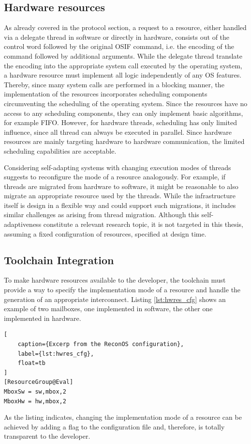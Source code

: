 \subsection{Hardware resources}
As already covered in the protocol section, a request to a resource, either
handled via a delegate thread in software or directly in hardware, consists
out of the control word followed by the original \ac{OSIF} command, i.e. the
encoding of the command followed by additional arguments. While the delegate
thread translate the encoding into the appropriate system call executed by the
operating system, a hardware resource must implement all logic independently
of any \ac{OS} features. Thereby, since many system calls are performed in a
blocking manner, the implementation of the resources incorporates scheduling
components circumventing the scheduling of the operating system. Since the
resources have no access to any scheduling components, they can only implement
basic algorithms, for example \acl{FIFO}. However, for hardware threads,
scheduling has only limited influence, since all thread can always be executed
in parallel. Since hardware resources are mainly targeting hardware to
hardware communication, the limited scheduling capabilities are acceptable.

Considering self-adapting systems with changing execution modes of threads
suggests to reconfigure the mode of a resource analogously. For example, if
threads are migrated from hardware to software, it might be reasonable to also
migrate an appropriate resource used by the threads. While the infrastructure
itself is design in a flexible way and could support such migrations, it
includes similar challenges as arising from thread migration. Although this
self-adaptiveness constitute a relevant research topic, it is not targeted in
this thesis, assuming a fixed configuration of resources, specified at design
time.

\subsection{Toolchain Integration}
To make hardware resources available to the developer, the toolchain must
provide a way to specify the implementation mode of a resource and handle the
generation of an appropriate interconnect. Listing \ref{lst:hwres_cfg} shows
an example of two mailboxes, one implemented in software, the other one
implemented in hardware.
\begin{lstlisting}[
	caption={Excerp from the ReconOS configuration},
	label={lst:hwres_cfg},
	float=tb
]
[ResourceGroup@Eval]
MboxSw = sw,mbox,2
MboxHw = hw,mbox,2
\end{lstlisting}
As the listing indicates, changing the implementation mode of a resource can
be achieved by adding a flag to the configuration file and, therefore, is
totally transparent to the developer.

